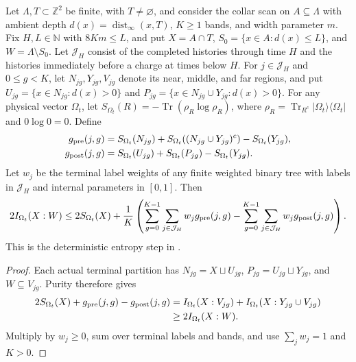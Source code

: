 \begin{theorem}
    \label{thm:area_law_actual_terminal_information}
    Let $\Lambda,T\subset\mathbb Z^2$ be finite, with $T\ne\varnothing$,
    and consider the collar scan on $A\subseteq\Lambda$ with ambient depth
    $d(x)=\operatorname{dist}_\infty(x,T)$, $K\ge1$ bands, and width parameter $m$.
    Fix $H,L\in\mathbb N$ with $8Km\le L$, and put
    $X=A\cap T$, $S_0=\{x\in A:d(x)\le L\}$, and $W=\Lambda\setminus S_0$.
    Let $\mathcal J_H$ consist of the completed histories through time $H$
    and the histories immediately before a charge at times below $H$.
    For $j\in\mathcal J_H$ and $0\le g<K$, let
    $N_{jg},Y_{jg},V_{jg}$ denote its near, middle, and far regions, and put
    $U_{jg}=\{x\in N_{jg}:d(x)>0\}$ and
    $P_{jg}=\{x\in N_{jg}\cup Y_{jg}:d(x)>0\}$.
    For any physical vector $\Omega_t$, let
    $S_{\Omega_t}(R)=-\operatorname{Tr}(\rho_R\log\rho_R)$, where
    $\rho_R=\operatorname{Tr}_{R^c}|\Omega_t\rangle\langle\Omega_t|$
    and $0\log0=0$. Define
    \begin{align*}
        g_{\rm pre}(j,g)
        &=S_{\Omega_t}(N_{jg})+S_{\Omega_t}((N_{jg}\cup Y_{jg})^c)
            -S_{\Omega_t}(Y_{jg}),\\
        g_{\rm post}(j,g)
        &=S_{\Omega_t}(U_{jg})+S_{\Omega_t}(P_{jg})-S_{\Omega_t}(Y_{jg}).
    \end{align*}
    Let $w_j$ be the terminal label weights of any finite weighted binary tree
    with labels in $\mathcal J_H$ and internal parameters in $[0,1]$. Then
    \begin{align*}
        2I_{\Omega_t}(X:W)
        \le 2S_{\Omega_t}(X)
          +\frac1K\left(\sum_{g=0}^{K-1}\sum_{j\in\mathcal J_H}w_jg_{\rm pre}(j,g)
            -\sum_{g=0}^{K-1}\sum_{j\in\mathcal J_H}w_jg_{\rm post}(j,g)\right).
    \end{align*}
    This is the deterministic entropy step in
    \cite[proof of Proposition~9.6, Section~9, lines~900--911]{OpenAI2026AreaLaw}.
\end{theorem}
\begin{proof}
    Each actual terminal partition has $N_{jg}=X\sqcup U_{jg}$,
    $P_{jg}=U_{jg}\sqcup Y_{jg}$, and $W\subseteq V_{jg}$.
    Purity therefore gives
    \begin{align*}
        2S_{\Omega_t}(X)+g_{\rm pre}(j,g)-g_{\rm post}(j,g)
        &= I_{\Omega_t}(X:V_{jg})+I_{\Omega_t}(X:Y_{jg}\cup V_{jg})\\
        &\ge 2I_{\Omega_t}(X:W).
    \end{align*}
    Multiply by $w_j\ge0$, sum over terminal labels and bands, and use
    $\sum_jw_j=1$ and $K>0$.
\end{proof}
